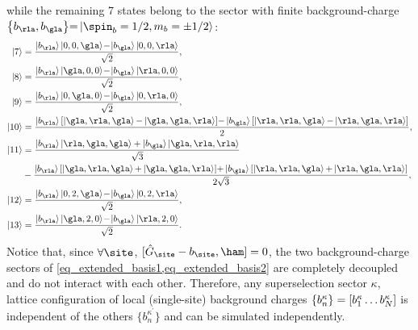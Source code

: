 \documentclass[aps,prl,reprint,twocolumn,superscriptaddress,floatfix,nofootinbib]{revtex4-2}
\begin{document}
while the remaining 7 states belong to the sector with finite background-charge $\qty{b_{\rla},b_{\gla}}{=}\ket{\spin_{b}=1/2,m_{b}=\pm1/2}$:
\begin{equation}
    \label{eq_extended_basis2}
    \begin{aligned}
        \ket{7}  & =\frac{\ket{b_{\rla}}\ket{0,0,\gla}\!-\!\ket{b_{\gla}}\ket{0,0,\rla}}{\sqrt{2}},  \\
        \ket{8}  & =\frac{\ket{b_{\rla}}\ket{\gla,0,0}\!-\!\ket{b_{\gla}}\ket{\rla,0,0}}{\sqrt{2}},  \\
        \ket{9}  & =\frac{\ket{b_{\rla}}\ket{0,\gla,0}\!-\!\ket{b_{\gla}}\ket{0,\rla,0}}{\sqrt{2}},  \\
        \ket{10} & =\frac{
            \ket{b_{\rla}}\qty[\ket{\gla,\rla,\gla}
                {-}\ket{\gla,\gla,\rla}]
            {-}\ket{b_{\gla}}\qty[\ket{\rla,\rla,\gla}
                {-}\ket{\rla,\gla,\rla}]
        }{2},                                                                                        \\
        \ket{11} & =\frac{
            \ket{b_{\rla}}\ket{\rla,\gla,\gla}
        +\ket{b_{\gla}}\ket{\gla,\rla,\rla}}{\sqrt{3}}                                               \\
                 & -\frac{
            \ket{b_{\rla}}\qty[\ket{\gla,\rla,\gla}{+}\ket{\gla,\gla,\rla}]{+}
            \ket{b_{\gla}}\qty[\ket{\rla,\rla,\gla}{+}\ket{\rla,\gla,\rla}]
        }{2\sqrt{3}},                                                                                \\
        \ket{12} & =\frac{\ket{b_{\rla}}\ket{0,2,\gla}\!-\!\ket{b_{\gla}}\ket{0,2,\rla}}{\sqrt{2}},  \\
        \ket{13} & =\frac{\ket{b_{\rla}}\ket{\gla,2,0}\!-\!\ket{b_{\gla}}\ket{\rla,2,0}}{\sqrt{2}} .
    \end{aligned}
\end{equation}
Notice that, since $\forall \site$, $[\hat{G}_{\site}-b_{\site},\ham]=0$, the two background-charge sectors of \cref{eq_extended_basis1,eq_extended_basis2} are completely decoupled and do not interact with each other.
Therefore, any superselection sector $\kappa$, \idest{} lattice configuration of local (single-site) background charges $\qty{b^{\kappa}_{n}}=\qty[b^{\kappa}_{1}\dots b^{\kappa}_{N}]$ is independent of the others $\{b^{\kappa^{\prime}}_{n}\}$ and can be simulated independently.
\end{document}
